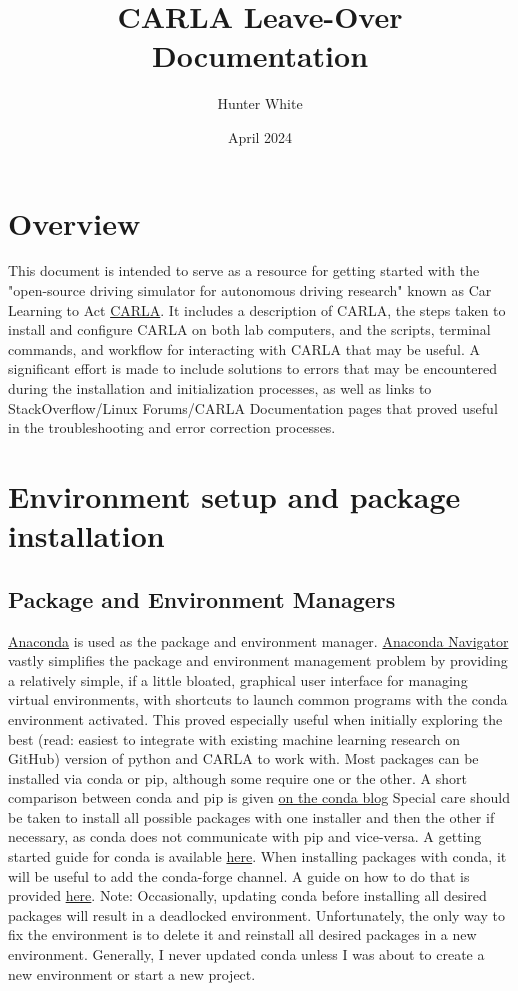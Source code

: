 \documentclass{article}
\title{CARLA Leave-Over Documentation}
\author{Hunter White}
\date{April 2024}
\begin{document}
\maketitle

\section{Overview}
\label{sec:Overview}
This document is intended to serve as a resource for getting started with the "open-source driving simulator for autonomous driving research" known as Car Learning to Act \href{https://carla.org/}{CARLA}. It includes a description of CARLA, the steps taken to install and configure CARLA on both lab computers, and the scripts, terminal commands, and workflow for interacting with CARLA that may be useful. A significant effort is made to include solutions to errors that may be encountered during the installation and initialization processes, as well as links to StackOverflow/Linux Forums/CARLA Documentation pages that proved useful in the troubleshooting and error correction processes.

\section{Environment setup and package installation}
\subsection{Package and Environment Managers}
\href{https://www.anaconda.com/}{Anaconda} is used as the package and environment manager. \href{https://www.anaconda.com/products/navigator}{Anaconda Navigator} vastly simplifies the package and environment management problem by providing a relatively simple, if a little bloated, graphical user interface for managing virtual environments, with shortcuts to launch common programs with the conda environment activated. This proved especially useful when initially exploring the best (read: easiest to integrate with existing machine learning research on GitHub) version of python and CARLA to work with. Most packages can be installed via conda or pip, although some require one or the other. A short comparison between conda and pip is given \href{https://www.anaconda.com/blog/understanding-conda-and-pip}{on the conda blog} Special care should be taken to install all possible packages with one installer and then the other if necessary, as conda does not communicate with pip and vice-versa. %
A getting started guide for conda is available \href{https://docs.conda.io/projects/conda/en/latest/user-guide/getting-started.html}{here}.
When installing packages with conda, it will be useful to add the conda-forge channel. A guide on how to do that is provided \href{https://docs.conda.io/projects/conda/en/latest/user-guide/concepts/channels.html}{here}.
Note: Occasionally, updating conda before installing all desired packages will result in a deadlocked environment. Unfortunately, the only way to fix the environment is to delete it and reinstall all desired packages in a new environment. Generally, I never updated conda unless I was about to create a new environment or start a new project.
\\
\end{document}
